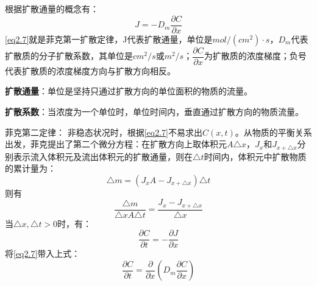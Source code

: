 \documentclass[UTF8]{ctexart}
\theoremstyle{plain}
\begin{document}
根据扩散通量的概念有：
\begin{equation}
    J = -D_m\dfrac{\partial C}{ \partial x}
    \label{eq2.7}
\end{equation}
\cref{eq2.7}就是\textcolor[rgb]{1,0,0}{菲克第一扩散定律}，J代表扩散通量，单位是$mol/(cm^2)\cdot s$，$D_m$代表扩散质的分子扩散系数，其单位是$cm^2/s$或$m^2/s$；$\dfrac{\partial C}{\partial x}$为扩散质的浓度梯度；负号代表扩散质的浓度梯度方向与扩散方向相反。

\textbf{\textcolor[rgb]{1,0,0}{扩散通量}}：单位是坚持只通过扩散方向的单位面积的物质的流量。

\textbf{\textcolor[rgb]{1,0,0}{扩散系数}}：当浓度为一个单位时，单位时间内，垂直通过扩散方向的物质流量。

\textcolor[rgb]{1,0,0}{菲克第二定律}：
非稳态状况时，根据\cref{eq2.7}不易求出$C(x,t)$。从物质的平衡关系出发，菲克提出了第二个微分方程：在扩散方向上取体积元$A\triangle x$，$J_x$和$J_{x+\triangle x}$分别表示流入体积元及流出体积元的扩散通量，则在$\triangle t$时间内，体积元中扩散物质的累计量为：
\begin{equation*}
    \triangle m = (J_xA - J_{x+\triangle x})\triangle t
\end{equation*}
则有
\begin{equation*}
    \dfrac{\triangle m}{\triangle x A \triangle t} = \dfrac{J_x-J_{x+\triangle x}}{\triangle x}
\end{equation*}
当$\triangle x, \triangle t>0$时，有：
\begin{equation*}
    \dfrac{\partial C}{\partial t} = -\dfrac{\partial J}{\partial x}
\end{equation*}
将\cref{eq2.7}带入上式：
\begin{equation*}
    \dfrac{\partial C}{\partial t} = \dfrac{\partial}{\partial x}\left(D_m \dfrac{\partial C}{\partial x}\right)
\end{equation*}



\end{document}
